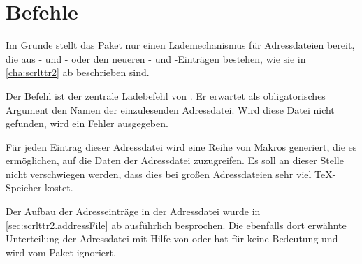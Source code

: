 \section{Befehle}

Im Grunde stellt das Paket nur einen Lademechanismus für Adressdateien bereit,
die aus - und
- oder den neueren
- und
-Einträgen bestehen, wie sie in
\autoref{cha:scrlttr2} ab  beschrieben
sind.


\begin{Declaration}
\end{Declaration}%
Der Befehl  ist der zentrale Ladebefehl
von .
Er erwartet als obligatorisches Argument den
Namen der einzulesenden Adressdatei.
Wird diese Datei nicht gefunden, wird ein Fehler ausgegeben.

Für jeden Eintrag dieser Adressdatei wird eine Reihe von Makros generiert,
die es ermöglichen, auf die Daten der Adressdatei zuzugreifen. Es soll an
dieser Stelle nicht verschwiegen werden, dass dies bei großen Adressdateien
sehr viel \TeX-Speicher kostet.
%
\EndIndexGroup

\begin{Declaration}%
\end{Declaration}%
Der Aufbau der Adresseinträge in der Adressdatei wurde in
\autoref{sec:scrlttr2.addressFile} ab
 ausführlich besprochen. Die
ebenfalls dort erwähnte Unterteilung der Adressdatei mit Hilfe von
 oder  hat für  keine
Bedeutung und wird vom Paket ignoriert.%
\EndIndexGroup

